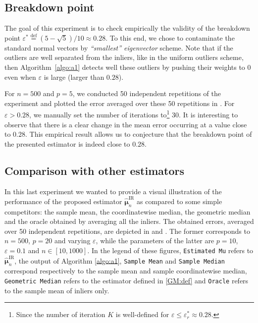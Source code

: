 \documentclass[aos,preprint,reqno]{imsart}
\newcommand\bmu{\boldsymbol\mu}
\def\hat{\widehat}
\theoremstyle{plain}
\theoremstyle{remark}
\begin{document}
\subsection{Breakdown point}
The goal of this experiment is to check empirically the validity of the breakdown point  $\varepsilon^* \stackrel{\text{def}}{=} (5 - \sqrt{5}) / 10\approx 0.28$. To this end, we chose to contaminate the standard normal vectors by {\it{``smallest'' eigenvector}} scheme. Note that if the outliers are well separated from the inliers, like in the uniform outliers scheme, then Algorithm~\ref{algo:a1} detects well these outliers by pushing their weights to $0$ even when $\varepsilon$ is large (larger than $0.28$).   

For $n=500$ and $p=5$, we conducted 50 independent repetitions of the experiment and plotted the error averaged over these 50 repetitions in . 
For $\varepsilon > 0.28$, we manually set the number of iterations to\footnote{Since the number of iteration $K$ is well-defined for $\varepsilon \le \varepsilon^*_r \approx 0.28$.} 30. It is interesting to observe that there is a clear change in the mean error occurring at a value close to 
$0.28$. This empirical result allows us to conjecture that the breakdown point of the presented estimator is indeed close to $0.28$.

\subsection{Comparison with other estimators}
In this last experiment we wanted to provide a visual illustration of the performance of the proposed estimator  $\hat{\bmu}^{\text{IR}}_n$ as compared to some simple competitors: the sample mean, the coordinatewise median, the geometric median and the oracle obtained by averaging all the inliers. The obtained errors, averaged over 50 independent repetitions, are depicted in  and .  The former corresponds to $n=500$, $p=20$ and varying $\varepsilon$, while the parameters of the latter are $p=10$, $\varepsilon = 0.1$ and $n \in [10, 1000]$. In the legend of these figures, \texttt{Estimated Mu} refers to $\hat{\bmu}^{\text{IR}}_n$, the output of Algorithm \ref{algo:a1}, \texttt{Sample Mean} and \texttt{Sample Median} correspond respectively to the sample mean and sample coordinatewise median,  \texttt{Geometric Median} refers to the estimator defined in \eqref{GM:def} and \texttt{Oracle} refers to the sample mean of inliers only. 
\end{document}
